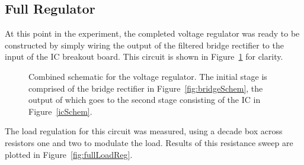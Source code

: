 \subsection{Full Regulator}
At this point in the experiment, the completed voltage regulator was ready to
be constructed by simply wiring the output of the filtered bridge rectifier to
the input of the IC breakout board.  This circuit is shown in
Figure~\ref{fig:fullSchem} for clarity.
%
\begin{figure}[H]
	\centering
	
	\parbox{.6\textwidth}{
	\caption[Schematic --- Combined Rectifier and IC]{Combined schematic for
	the voltage regulator.  The initial stage is comprised of the bridge
	rectifier in Figure~\ref{fig:bridgeSchem}, the output of which goes to the
	second stage consisting of the IC in Figure~\ref{icSchem}.}
	\label{fig:fullSchem}
	}
\end{figure}
%
The load regulation for this circuit was measured, using a decade box across
resistors one and two to modulate the load.  Results of this resistance sweep
are plotted in Figure~\ref{fig:fullLoadReg}.
